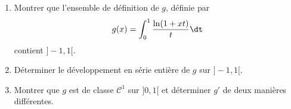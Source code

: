 \documentclass[a4paper,10pt]{report}
\begin{document}
\begin{Exa} \begin{enumerate}
\item Montrer que l'ensemble de définition de $g$, définie par 
$$ g(x) = \int_{0}^1 \dfrac{\ln(1+xt)}{t} \dt$$
contient $]-1,1[$.
\item Déterminer le développement en série entière de $g$ sur $]-1,1[$.
\item Montrer que $g$ est de classe $\mathcal{C}^1$ sur $]0,1[$ et déterminer $g'$ de deux manières différentes.
\end{enumerate}
\end{Exa}

\end{document}
